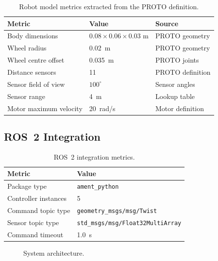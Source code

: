 \documentclass[conference]{IEEEtran}
\begin{document}
\begin{table}[t]
    \centering
    \caption{Robot model metrics extracted from the PROTO definition.}
    \label{tab:robot}
    \begin{tabular}{lll}
        \toprule
        Metric & Value & Source \\
        \midrule
        Body dimensions & $0.08 \times 0.06 \times 0.03$ m & PROTO geometry \\
        Wheel radius & \SI{0.02}{m} & PROTO geometry \\
        Wheel centre offset & \SI{0.035}{m} & PROTO joints \\
        Distance sensors & 11 & PROTO definition \\
        Sensor field of view & $100^{\circ}$ & Sensor angles \\
        Sensor range & \SI{4}{m} & Lookup table \\
        Motor maximum velocity & \SI{20}{rad/s} & Motor definition \\
        \bottomrule
    \end{tabular}
\end{table}

\subsection{ROS~2 Integration}

\begin{table}[t]
    \centering
    \caption{ROS~2 integration metrics.}
    \label{tab:ros}
    \begin{tabular}{ll}
        \toprule
        Metric & Value \\
        \midrule
        Package type & \texttt{ament\_python} \\
        Controller instances & 5 \\
        Command topic type & \texttt{geometry\_msgs/msg/Twist} \\
        Sensor topic type & \texttt{std\_msgs/msg/Float32MultiArray} \\
        Command timeout & \SI{1.0}{s} \\
        \bottomrule
    \end{tabular}
\end{table}

\begin{figure}[t]
    \centering
    \caption{System architecture.}
    \label{fig:architecture}
\end{figure}
\end{document}
